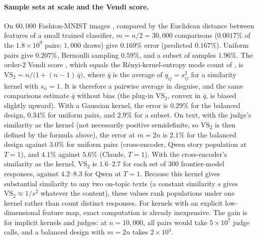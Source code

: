 \paragraph{Sample sets at scale and the Vendi score.} On $60{,}000$
Fashion-MNIST images \citep{xiao2017fashion}, compared by the Euclidean
distance between features of a small trained classifier, $m=n/2=30{,}000$
comparisons ($0.0017\%$ of the $1.8\times10^9$ pairs; $1{,}000$ draws) give
$0.169\%$ error (predicted $0.167\%$). Uniform pairs give $0.207\%$,
Bernoulli sampling $0.59\%$, and a subset of samples $1.96\%$. The order-$2$
Vendi score \citep{friedman2023vendi,pasarkar2024cousins}, which equals the
R\'enyi-kernel-entropy mode count of \citet{jalali2023information}, is
$\mathrm{VS}_2=n/\bigl(1+(n-1)\,\bar q\bigr)$, where $\bar q$ is the average
of $q_{ij}=s_{ij}^2$ for a similarity kernel with $s_{ii}=1$. It is therefore a pairwise
average in disguise, and the same comparisons estimate $\bar q$ without bias
(the plug-in $\mathrm{VS}_2$, convex in $\bar q$, is biased slightly upward). With a Gaussian
kernel, the error is $0.29\%$ for the balanced design, $0.34\%$ for uniform
pairs, and $2.9\%$ for a subset. On text, with the judge's similarity as the
kernel (not necessarily positive semidefinite, so $\mathrm{VS}_2$ is then defined
by the formula above), the error at $m=2n$ is $2.1\%$ for the balanced design against
$3.0\%$ for uniform pairs (cross-encoder, Qwen story population at $T=1$),
and $4.1\%$ against $5.6\%$ (Claude, $T=1$). With the cross-encoder's similarity as the
kernel, $\mathrm{VS}_2$ is $1.6$--$2.7$ for each set of $300$ frontier-model
responses, against $4.2$--$8.3$ for Qwen at $T=1$. Because this kernel gives
substantial similarity to any two on-topic texts (a constant similarity $s$
gives $\mathrm{VS}_2\approx1/s^2$ whatever the content), these values rank
populations under one kernel rather than count distinct responses. For kernels with an explicit
low-dimensional feature map, exact computation is already inexpensive. The
gain is for implicit kernels and judges: at $n=10{,}000$, all pairs would
take $5\times10^7$ judge calls, and a balanced design with $m=2n$ takes
$2\times10^4$.
